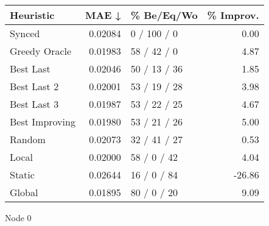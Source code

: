 \begin{tabular}{lrlr}
\toprule
\textbf{Heuristic} & \textbf{MAE ↓} & \textbf{\% Be/Eq/Wo} & \textbf{\% Improv.} \\
\midrule
            Synced &        0.02084 &          0 / 100 / 0 &                0.00 \\
     Greedy Oracle &        0.01983 &          58 / 42 / 0 &                4.87 \\
         Best Last &        0.02046 &         50 / 13 / 36 &                1.85 \\
       Best Last 2 &        0.02001 &         53 / 19 / 28 &                3.98 \\
       Best Last 3 &        0.01987 &         53 / 22 / 25 &                4.67 \\
    Best Improving &        0.01980 &         53 / 21 / 26 &                5.00 \\
            Random &        0.02073 &         32 / 41 / 27 &                0.53 \\
             Local &        0.02000 &          58 / 0 / 42 &                4.04 \\
            Static &        0.02644 &          16 / 0 / 84 &              -26.86 \\
            Global &        0.01895 &          80 / 0 / 20 &                9.09 \\
\bottomrule
\end{tabular}
\caption{Node 0}
\label{tab:iid_lr01_le1_bs2_0}
